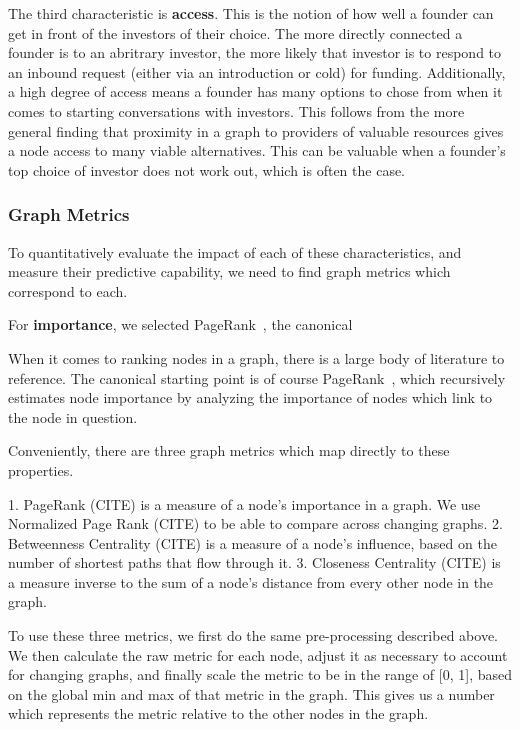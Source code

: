 The third characteristic is \textbf{access}. This is the notion of how well a founder can get in front of the investors of their choice. The more directly connected a founder is to an abritrary investor, the more likely that investor is to respond to an inbound request (either via an introduction or cold) for funding. Additionally, a high degree of access means a founder has many options to chose from when it comes to starting conversations with investors. This follows from the more general finding that proximity in a graph to providers of valuable resources gives a node access to many viable alternatives\cite{10.2307/3069443}. This can be valuable when a founder's top choice of investor does not work out, which is often the case.

\subsubsection{Graph Metrics}

To quantitatively evaluate the impact of each of these characteristics, and measure their predictive capability, we need to find graph metrics which correspond to each.

For \textbf{importance}, we selected PageRank~\cite{page1999pagerank}, the canonical

When it comes to ranking nodes in a graph, there is a large body of literature to reference. The canonical starting point is of course PageRank~\cite{page1999pagerank}, which recursively estimates node importance by analyzing the importance of nodes which link to the node in question.

Conveniently, there are three graph metrics which map directly to these properties.

  1. PageRank (CITE) is a measure of a node's importance in a graph. We use Normalized Page Rank (CITE) to be able to compare across changing graphs.
  2. Betweenness Centrality (CITE) is a measure of a node's influence, based on the number of shortest paths that flow through it.
  3. Closeness Centrality (CITE) is a measure inverse to the sum of a node's distance from every other node in the graph.

To use these three metrics, we first do the same pre-processing described above. We then calculate the raw metric for each node, adjust it as necessary to account for changing graphs, and finally scale the metric to be in the range of [0, 1], based on the global min and max of that metric in the graph. This gives us a number which represents the metric relative to the other nodes in the graph.

